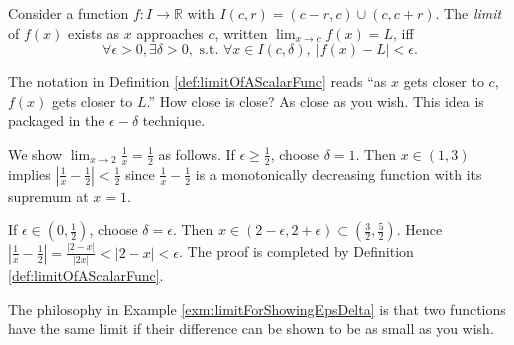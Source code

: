 \begin{defn}
  \label{def:limitOfAScalarFunc}
  Consider a function $f: I\rightarrow \mathbb{R}$
   with $I(c,r)=(c-r,c)\cup (c,c+r)$.
  The \emph{limit} of $f(x)$  exists
   as $x$ approaches $c$, written
     $\lim_{x\rightarrow c} f(x) = L$,
  iff 
  \begin{equation}
 \forall \epsilon>0, \exists \delta>0, \text{ s.t. }
    \forall x\in I(c,\delta),\ |f(x)-L|<\epsilon.
  \end{equation}
\end{defn}

\begin{rem}
  The notation in Definition \ref{def:limitOfAScalarFunc}
  reads ``as $x$ gets closer to $c$,
 $f(x)$ gets closer to $L$.''
How close is close?
As close as you wish.
This idea is packaged in the $\epsilon-\delta$ technique.
\end{rem}

\begin{exm}
  \label{exm:limitForShowingEpsDelta}
   We show $\lim_{x\rightarrow 2}\frac{1}{x}= \frac{1}{2}$ as follows.
   If $\epsilon\ge \frac{1}{2}$,
   choose $\delta=1$.
   Then $x\in(1,3)$ implies
   $\left|\frac{1}{x}-\frac{1}{2}\right|<\frac{1}{2}$
   since $\frac{1}{x}-\frac{1}{2}$
   is a monotonically decreasing function
   with its supremum at $x=1$.

  If $\epsilon\in (0,\frac{1}{2})$,
   choose $\delta=\epsilon$.
  Then $x\in (2-\epsilon,2+\epsilon)\subset
  (\frac{3}{2},\frac{5}{2})$.
  Hence
  $\left|\frac{1}{x}-\frac{1}{2}\right|=\frac{|2-x|}{|2x|}<|2-x|<\epsilon$.
  The proof is completed by Definition \ref{def:limitOfAScalarFunc}.
\end{exm}

\begin{rem}
  The philosophy in Example \ref{exm:limitForShowingEpsDelta}
  is that two functions have the same limit
  if their difference can be shown to be as small as you wish.
\end{rem}


